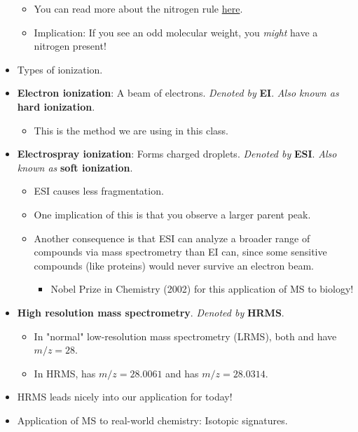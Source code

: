 \documentclass[../notes.tex]{subfiles}
\begin{document}
\begin{itemize}
\begin{itemize}
        \item You can read more about the nitrogen rule \href{https://en.wikipedia.org/wiki/Nitrogen_rule}{here}.
        \item Implication: If you see an odd molecular weight, you \emph{might} have a nitrogen present!
    \end{itemize}
    \item Types of ionization.
    \item \textbf{Electron ionization}: A beam of electrons. \emph{Denoted by} \textbf{EI}. \emph{Also known as} \textbf{hard ionization}.
    \begin{itemize}
        \item This is the method we are using in this class.
    \end{itemize}
    \item \textbf{Electrospray ionization}: Forms charged droplets. \emph{Denoted by} \textbf{ESI}. \emph{Also known as} \textbf{soft ionization}.
    \begin{itemize}
        \item ESI causes less fragmentation.
        \item One implication of this is that you observe a larger parent peak.
        \item Another consequence is that ESI can analyze a broader range of compounds via mass spectrometry than EI can, since some sensitive compounds (like proteins) would never survive an electron beam.
        \begin{itemize}
            \item Nobel Prize in Chemistry (2002) for this application of MS to biology!
        \end{itemize}
    \end{itemize}
    \item \textbf{High resolution mass spectrometry}. \emph{Denoted by} \textbf{HRMS}.
    \begin{itemize}
        \item In "normal" low-resolution mass spectrometry (LRMS), both  and  have $m/z=28$.
        \item In HRMS,  has $m/z=28.0061$ and  has $m/z=28.0314$.
    \end{itemize}
    \item HRMS leads nicely into our application for today!
    \item Application of MS to real-world chemistry: Isotopic signatures.
    \begin{itemize}

\end{itemize}
\end{itemize}
\end{document}
